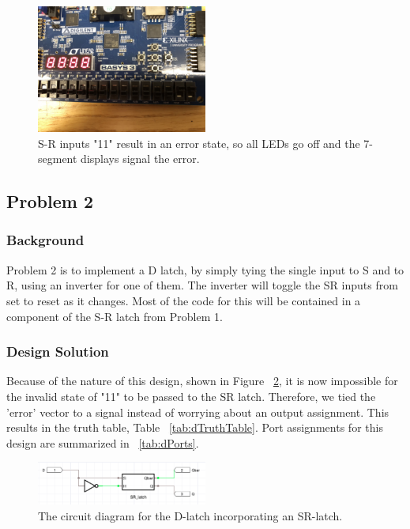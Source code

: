 \documentclass[11pt]{article}
\begin{document}
\begin{figure}[H]
\begin{center}
	\includegraphics[width=0.5\textwidth]{./images/img_104.jpg}
	\caption{\label{fig:srResultFour}S-R inputs "11" result in an error state, so all LEDs go off and the 7-segment displays signal the error.}
\end{center}
\end{figure}

\subsection{Problem 2 }

\subsubsection{Background}
Problem 2 is to implement a D latch, by simply tying the single input to S and to R, using an inverter for one of them. The inverter will toggle the SR inputs from set to reset as it changes. Most of the code for this will be contained in a component of the S-R latch from Problem 1.

\subsubsection{Design Solution}
Because of the nature of this design, shown in Figure ~\ref{fig:d_circuit_diagram}, it is now impossible for the invalid state of "11" to be passed to the SR latch. Therefore, we tied the 'error' vector to a signal instead of worrying about an output assignment. This results in the truth table, Table ~\ref{tab:dTruthTable}. Port assignments for this design are summarized in ~\ref{tab:dPorts}.

\begin{figure}[H]
\begin{center}
	\includegraphics[width=0.5\textwidth]{./images/d_diagram.png}
	\caption{\label{fig:d_circuit_diagram}The circuit diagram for the D-latch incorporating an SR-latch.}
\end{center}
\end{figure}
\end{document}
